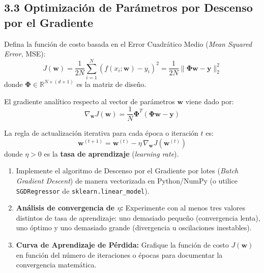 \documentclass[11pt,a4paper]{article}
\begin{document}
\subsection{3.3 Optimización de Parámetros por Descenso por el Gradiente}
Defina la función de costo basada en el Error Cuadrático Medio (\textit{Mean Squared Error}, MSE):
\begin{equation}
    J(\mathbf{w}) = \frac{1}{2N} \sum_{i=1}^N \left( f(x_i; \mathbf{w}) - y_i \right)^2 = \frac{1}{2N} \|\bm{\Phi} \mathbf{w} - \mathbf{y}\|_2^2
\end{equation}
donde $\bm{\Phi} \in \mathbb{R}^{N \times (d+1)}$ es la matriz de diseño.

El gradiente analítico respecto al vector de parámetros $\mathbf{w}$ viene dado por:
\begin{equation}
    \nabla_\mathbf{w} J(\mathbf{w}) = \frac{1}{N} \bm{\Phi}^T (\bm{\Phi} \mathbf{w} - \mathbf{y})
\end{equation}

La regla de actualización iterativa para cada época o iteración $t$ es:
\begin{equation}
    \mathbf{w}^{(t+1)} = \mathbf{w}^{(t)} - \eta \, \nabla_\mathbf{w} J(\mathbf{w}^{(t)})
\end{equation}
donde $\eta > 0$ es la \textbf{tasa de aprendizaje} (\textit{learning rate}).

\begin{alertbox}
\begin{enumerate}[leftmargin=*,itemsep=2pt]
    \item Implemente el algoritmo de Descenso por el Gradiente por lotes (\textit{Batch Gradient Descent}) de manera vectorizada en Python/NumPy (o utilice \texttt{SGDRegressor} de \texttt{sklearn.linear\_model}).
    \item \textbf{Análisis de convergencia de $\eta$:} Experimente con al menos tres valores distintos de tasa de aprendizaje: uno demasiado pequeño (convergencia lenta), uno óptimo y uno demasiado grande (divergencia u oscilaciones inestables).
    \item \textbf{Curva de Aprendizaje de Pérdida:} Grafique la función de costo $J(\mathbf{w})$ en función del número de iteraciones o épocas para documentar la convergencia matemática.
\end{enumerate}
\end{alertbox}
\end{document}
